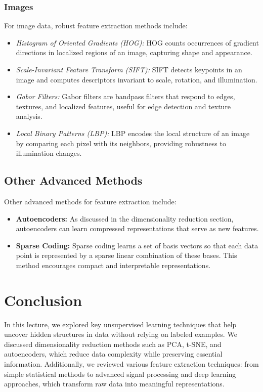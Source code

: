\documentclass[12pt]{article}
\begin{document}
\subsubsection{Images}
For image data, robust feature extraction methods include:
\begin{itemize}
    \item \textit{Histogram of Oriented Gradients (HOG):}  
    HOG counts occurrences of gradient directions in localized regions of an image, capturing shape and appearance.
    \item \textit{Scale-Invariant Feature Transform (SIFT):}  
    SIFT detects keypoints in an image and computes descriptors invariant to scale, rotation, and illumination.
    \item \textit{Gabor Filters:}  
    Gabor filters are bandpass filters that respond to edges, textures, and localized features, useful for edge detection and texture analysis.
    \item \textit{Local Binary Patterns (LBP):}  
    LBP encodes the local structure of an image by comparing each pixel with its neighbors, providing robustness to illumination changes.
\end{itemize}

\subsection{Other Advanced Methods}
Other advanced methods for feature extraction include:
\begin{itemize}
    \item \textbf{Autoencoders:}  
    As discussed in the dimensionality reduction section, autoencoders can learn compressed representations that serve as new features.
    \item \textbf{Sparse Coding:}  
    Sparse coding learns a set of basis vectors so that each data point is represented by a sparse linear combination of these bases. This method encourages compact and interpretable representations.
\end{itemize}

\section{Conclusion}

In this lecture, we explored key unsupervised learning techniques that help uncover hidden structures in data without relying on labeled examples. We discussed dimensionality reduction methods such as PCA, t-SNE, and autoencoders, which reduce data complexity while preserving essential information. Additionally, we reviewed various feature extraction techniques: from simple statistical methods to advanced signal processing and deep learning approaches, which transform raw data into meaningful representations.
\end{document}
